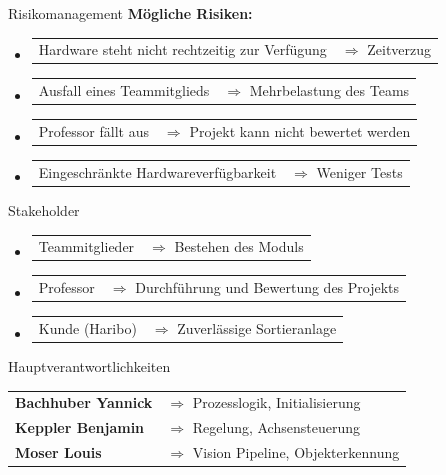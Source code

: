 \documentclass[aspectratio=169]{beamer}
\begin{document}
	\begin{frame}{Risikomanagement}
		\textbf{Mögliche Risiken:}
		\begin{itemize}
			\item \begin{tabular}[t]{@{}p{7.5cm} l@{}}
				Hardware steht nicht rechtzeitig zur Verfügung & $\Rightarrow$ Zeitverzug
			\end{tabular}
			\item \begin{tabular}[t]{@{}p{7.5cm} l@{}}
				Ausfall eines Teammitglieds & $\Rightarrow$ Mehrbelastung des Teams
			\end{tabular}
			\item \begin{tabular}[t]{@{}p{7.5cm} l@{}}
				Professor fällt aus & $\Rightarrow$ Projekt kann nicht bewertet werden
			\end{tabular}
			\item \begin{tabular}[t]{@{}p{7.5cm} l@{}}
				Eingeschränkte Hardwareverfügbarkeit & $\Rightarrow$ Weniger Tests
			\end{tabular}
		\end{itemize}
	\end{frame}
		
	\begin{frame}{Stakeholder}
		\begin{itemize}
			\item \begin{tabular}[t]{@{}p{3cm} l@{}}
				Teammitglieder & $\Rightarrow$ Bestehen des Moduls
			\end{tabular}
			\item \begin{tabular}[t]{@{}p{3cm} l@{}}
				Professor & $\Rightarrow$ Durchführung und Bewertung des Projekts
			\end{tabular}
			\item \begin{tabular}[t]{@{}p{3cm} l@{}}
				Kunde (Haribo) & $\Rightarrow$ Zuverlässige Sortieranlage
			\end{tabular}
		\end{itemize}
	\end{frame}
	
	
	\begin{frame}{Hauptverantwortlichkeiten}
		\begin{tabular}{@{}l l@{}}
			\textbf{Bachhuber Yannick} & $\Rightarrow$ Prozesslogik, Initialisierung \\ 
			\textbf{Keppler Benjamin} & $\Rightarrow$ Regelung, Achsensteuerung \\
			\textbf{Moser Louis} & $\Rightarrow$ Vision Pipeline, Objekterkennung \\
		\end{tabular}
	\end{frame}
	
\end{document}
